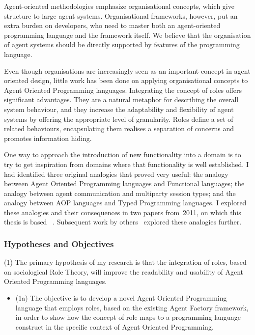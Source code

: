 \documentclass[a4paper,12pt,oneside,fleqn]{book} %
\begin{document}
Agent-oriented methodologies emphasize organisational concepts, which give
structure to large agent systems. Organisational frameworks, however, put
an extra burden on developers, who need to master both an agent-oriented
programming language and the framework itself. We believe that the
organisation of agent systems should be directly supported by features of
the programming language.

Even though organisations are increasingly seen as an important concept in
agent oriented design, little work has been done on applying organisational
concepts to Agent Oriented Programming languages. Integrating the concept
of roles offers significant advantages. They are a natural metaphor for
describing the overall system behaviour, and they increase the adaptability
and flexibility of agent systems by offering the appropriate level of
granularity. Roles define a set of related behaviours, encapsulating them
realises a separation of concerns and promotes information hiding.

One way to approach the introduction of new functionality into a domain is
to try to get inspiration from domains where that functionality is well
established. I had identified three original analogies that proved very
useful: the analogy between Agent Oriented Programming languages and
Functional languages; the analogy between agent communication and
multiparty session types; and the analogy between AOP languages and Typed
Programming languages. I explored these analogies and their consequences
in two papers from~2011, on which this thesis is based~%
  \cite{DBLP:conf/oopsla/GrigoreC11,DBLP:conf/iat/GrigoreC11}.
Subsequent work by others~\cite{%
  DBLP:conf/dalt/AnconaDM12,%
  DBLP:conf/promas/RicciS12,%
  DBLP:conf/dalt/SolimandoT12}
  explored these analogies further.


\subsubsection{Hypotheses and Objectives}
(1) The primary hypothesis of my research is that the integration of roles,
based on sociological Role Theory, will improve the readability and
usability of Agent Oriented Programming languages. 
\begin{itemize}

  \item (1a) The objective is to develop a novel Agent Oriented Programming
    language that employs roles, based on the existing Agent Factory
    framework, in order to show how the concept of role maps to a
    programming language construct in the specific context of Agent
    Oriented Programming.

\end{itemize}
\end{document}
